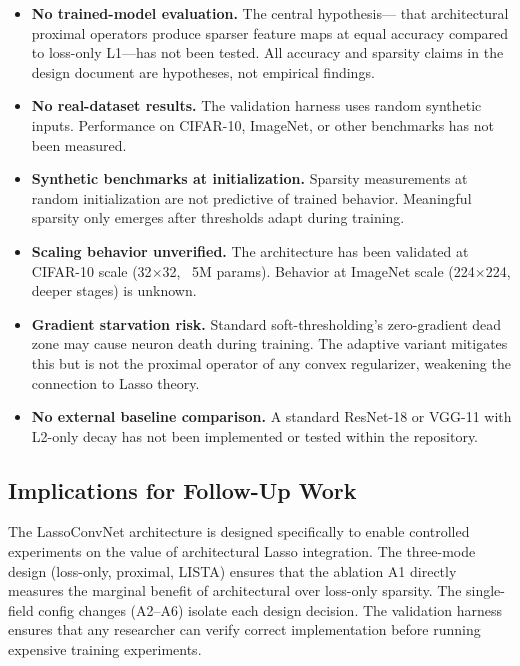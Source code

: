 \documentclass{article}
\begin{document}
\begin{itemize}
    \item \textbf{No trained-model evaluation.} The central hypothesis---
          that architectural proximal operators produce sparser feature maps
          at equal accuracy compared to loss-only L1---has not been tested.
          All accuracy and sparsity claims in the design document are
          hypotheses, not empirical findings.
    \item \textbf{No real-dataset results.} The validation harness uses
          random synthetic inputs. Performance on CIFAR-10, ImageNet, or
          other benchmarks has not been measured.
    \item \textbf{Synthetic benchmarks at initialization.} Sparsity
          measurements at random initialization are not predictive of
          trained behavior. Meaningful sparsity only emerges after
          thresholds adapt during training.
    \item \textbf{Scaling behavior unverified.} The architecture has been
          validated at CIFAR-10 scale (32$\times$32, ~5M params). Behavior
          at ImageNet scale (224$\times$224, deeper stages) is unknown.
    \item \textbf{Gradient starvation risk.} Standard soft-thresholding's
          zero-gradient dead zone may cause neuron death during training.
          The adaptive variant mitigates this but is not the proximal
          operator of any convex regularizer, weakening the connection
          to Lasso theory.
    \item \textbf{No external baseline comparison.} A standard ResNet-18
          or VGG-11 with L2-only decay has not been implemented or tested
          within the repository.
\end{itemize}

\subsection{Implications for Follow-Up Work}

The LassoConvNet architecture is designed specifically to enable controlled
experiments on the value of architectural Lasso integration. The three-mode
design (loss-only, proximal, LISTA) ensures that the ablation A1 directly
measures the marginal benefit of architectural over loss-only sparsity. The
single-field config changes (A2--A6) isolate each design decision. The
validation harness ensures that any researcher can verify correct
implementation before running expensive training experiments.
\end{document}
